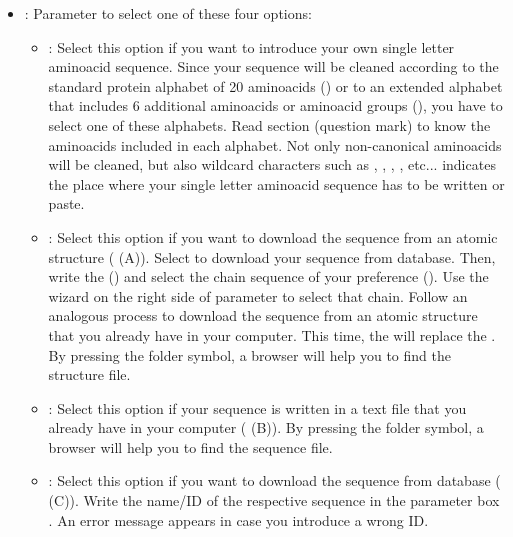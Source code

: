 \begin{itemize}
\begin{itemize}
  \begin{itemize}
  \item {}: Parameter to select one of these four options:
   \begin{itemize}
   \item {}: Select this option if you want to introduce your own single letter aminoacid sequence. Since your sequence will be cleaned according to the standard protein alphabet of 20 aminoacids () or to an extended alphabet that includes 6 additional aminoacids or aminoacid groups (), you have to select one of these  alphabets. Read  section (question mark) to know the aminoacids included in each alphabet. Not only non-canonical aminoacids will be cleaned, but also wildcard characters such as \ttt{*}, \ttt{\#}, , \ttt{-}, etc...  indicates the place where your single letter aminoacid sequence has to be written or paste. 
   \item {}: Select this option if you want to download the sequence from an atomic structure ( (A)). Select  to download your sequence from  database. Then, write the  () and select the chain sequence of your preference (). Use the wizard on the right side of  parameter to select that chain. Follow an analogous process to download the sequence from an atomic structure that you already have in your computer. This time, the  will replace the . By pressing the folder symbol, a browser will help you to find the structure file.
   \item {}: Select this option if your sequence is written in a text file that you already have in your computer ( (B)). By pressing the folder symbol, a browser will help you to find the sequence file.
   \item {}: Select this option if you want to download the sequence from  database ( (C)). Write the name/ID of the respective sequence in the parameter box . An error message appears in case you introduce a wrong ID.
   

\end{itemize}
\end{itemize}
\end{itemize}
\end{itemize}
